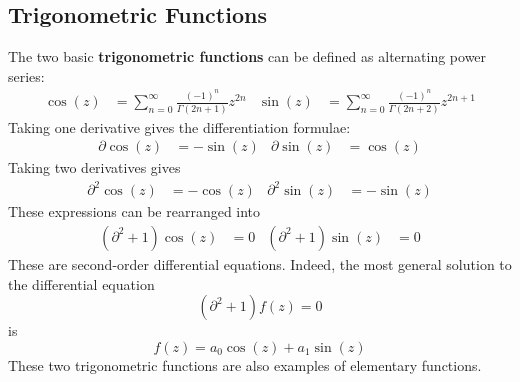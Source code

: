 \subsection{Trigonometric Functions}
The two basic \textbf{trigonometric functions} can be defined as alternating power series:
\begin{align}
	\cos(z) & = \sum_{n = 0}^{\infty} \frac{(-1)^{n}}{\Gamma(2n + 1)} z^{2n} & \sin(z) & = \sum_{n = 0}^{\infty} \frac{(-1)^{n}}{\Gamma(2n + 2)} z^{2n + 1}
\end{align}
Taking one derivative gives the differentiation formulae:
\begin{align}
	\partial \cos(z) & = -\sin(z) & \partial \sin(z) & = \cos(z)
\end{align}
Taking two derivatives gives
\begin{align}
	\partial^{2} \cos(z) & = -\cos(z) & \partial^{2} \sin(z) & = -\sin(z)
\end{align}
These expressions can be rearranged into
\begin{align}
	\left( \partial^{2} + 1 \right) \cos(z) & = 0 & \left( \partial^{2} + 1 \right) \sin(z) & = 0
\end{align}
These are second-order differential equations. Indeed, the most general solution to the differential equation
\begin{equation}
	\left( \partial^{2} + 1 \right) f(z) = 0
\end{equation}
is
\begin{equation}
	f(z) = a_{0} \cos(z) + a_{1} \sin(z)
\end{equation}
These two trigonometric functions are also examples of elementary functions.

